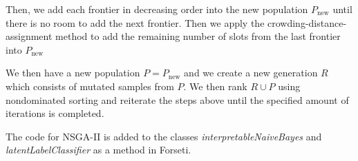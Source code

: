 Then, we add each frontier in decreasing order into the new population $P_\text{new}$ until there is no room to add the next frontier. Then we apply the crowding-distance-assignment method to add the remaining number of slots from the last frontier into $P_\text{new}$ \cite[p.~185]{Pratap:2002:IEEE.Trans.Evol.Comput.}

We then have a new population $P = P_{\text{new}}$ and we create a new generation $R$ which consists of mutated samples from $P$. We then rank $R \cup P$ using nondominated sorting and reiterate the steps above until the specified amount of iterations is completed.

The code for NSGA-II is added to the classes \emph{interpretableNaiveBayes} and \emph{latentLabelClassifier} as a method in Forseti.